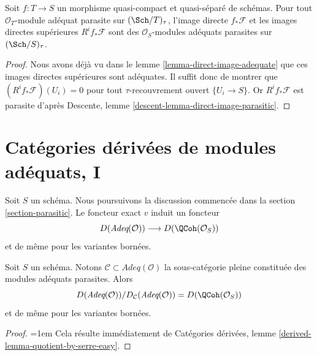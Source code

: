 \begin{lemma}
\label{lemma-direct-image-parasitic-adequate}
Soit $f : T \to S$ un morphisme quasi-compact et quasi-séparé
de schémas. Pour tout $\mathcal{O}_T$-module adéquat parasite sur
$(\Sch/T)_\tau$, l'image directe
$f_*\mathcal{F}$ et les images directes supérieures $R^if_*\mathcal{F}$
sont des $\mathcal{O}_S$-modules adéquats parasites sur $(\Sch/S)_\tau$.
\end{lemma}

\begin{proof}
Nous avons déjà vu dans le
lemme \ref{lemma-direct-image-adequate}
que ces images directes supérieures sont adéquates.
Il suffit donc de montrer que
$(R^if_*\mathcal{F})(U_i) = 0$ pour tout $\tau$-recouvrement
ouvert $\{U_i \to S\}$. Or $R^if_*\mathcal{F}$
est parasite d'après
Descente, lemme \ref{descent-lemma-direct-image-parasitic}.
\end{proof}













\section{Catégories dérivées de modules adéquats, I}
\label{section-comparison}


\noindent
Soit $S$ un schéma. Nous poursuivons la discussion commencée dans la
section \ref{section-parasitic}.
Le foncteur exact $v$ induit un foncteur
$$
D(\textit{Adeq}(\mathcal{O}))
\longrightarrow
D(\QCoh(\mathcal{O}_S))
$$
et de même pour les variantes bornées.

\begin{lemma}
\label{lemma-quotient-easy}
Soit $S$ un schéma. Notons
$\mathcal{C} \subset \textit{Adeq}(\mathcal{O})$ la
sous-catégorie pleine constituée des modules adéquats parasites.
Alors
$$
D(\textit{Adeq}(\mathcal{O}))/D_\mathcal{C}(\textit{Adeq}(\mathcal{O}))
= D(\QCoh(\mathcal{O}_S))
$$
et de même pour les variantes bornées.
\end{lemma}

\begin{proof}
{\emergencystretch=1em
Cela résulte immédiatement de
Catégories dérivées, lemme \ref{derived-lemma-quotient-by-serre-easy}.\par}
\end{proof}

